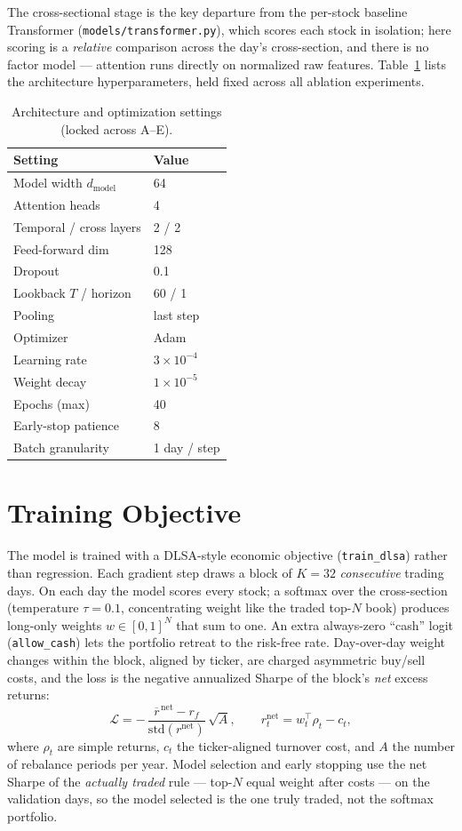 \documentclass[10pt,twocolumn]{article}
\begin{document}
The cross-sectional stage is the key departure from the per-stock
baseline Transformer (\texttt{models/transformer.py}), which scores each
stock in isolation; here scoring is a \emph{relative} comparison across
the day's cross-section, and there is no factor model --- attention runs
directly on normalized raw features. Table~\ref{tab:arch} lists the
architecture hyperparameters, held fixed across all ablation experiments.

\begin{table}[t]
\centering
\small
\caption{Architecture and optimization settings (locked across A--E).}
\label{tab:arch}
\begin{tabular}{@{}ll@{}}
\toprule
Setting & Value \\
\midrule
Model width $d_{\text{model}}$ & 64 \\
Attention heads & 4 \\
Temporal / cross layers & 2 / 2 \\
Feed-forward dim & 128 \\
Dropout & 0.1 \\
Lookback $T$ / horizon & 60 / 1 \\
Pooling & last step \\
\midrule
Optimizer & Adam \\
Learning rate & $3\!\times\!10^{-4}$ \\
Weight decay & $1\!\times\!10^{-5}$ \\
Epochs (max) & 40 \\
Early-stop patience & 8 \\
Batch granularity & 1 day / step \\
\bottomrule
\end{tabular}
\end{table}

\section{Training Objective}
The model is trained with a DLSA-style economic objective
(\texttt{train\_dlsa}) rather than regression. Each gradient step draws a
block of $K{=}32$ \emph{consecutive} trading days. On each day the model
scores every stock; a softmax over the cross-section (temperature
$\tau{=}0.1$, concentrating weight like the traded top-$N$ book) produces
long-only weights $w \in [0,1]^{N}$ that sum to one. An extra always-zero
``cash'' logit (\texttt{allow\_cash}) lets the portfolio retreat to the
risk-free rate. Day-over-day weight changes within the block, aligned by
ticker, are charged asymmetric buy/sell costs, and the loss is the
negative annualized Sharpe of the block's \emph{net} excess returns:
\[
\mathcal{L} = -\,\frac{\overline{r}^{\,\text{net}} - r_f}
{\mathrm{std}(r^{\text{net}})}\,\sqrt{A},
\qquad
r^{\text{net}}_t = w_t^{\!\top} \rho_t - c_t,
\]
where $\rho_t$ are simple returns, $c_t$ the ticker-aligned turnover
cost, and $A$ the number of rebalance periods per year. Model selection
and early stopping use the net Sharpe of the \emph{actually traded} rule
--- top-$N$ equal weight after costs --- on the validation days, so the
model selected is the one truly traded, not the softmax portfolio.
\end{document}
